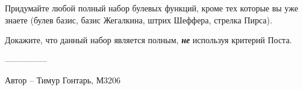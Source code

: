 \question
Придумайте любой полный набор булевых функций, кроме тех которые вы уже знаете (булев базис, базис Жегалкина, штрих Шеффера, стрелка Пирса).

Докажите, что данный набор является полным, \textbf{\textit{не}} используя критерий Поста.

---------------

Автор -- Тимур Гонтарь, М3206